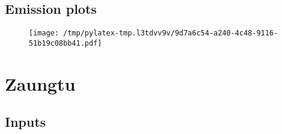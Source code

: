 \documentclass{article}%
\begin{document}
\subsection{Emission plots}%
\label{subsec:Emissionplots}%


\begin{figure}[htbp]%
\centering%
\texttt{[image: /tmp/pylatex-tmp.l3tdvv9v/9d7a6c54-a240-4c48-9116-51b19c08bb41.pdf]}%
\end{figure}

%
\section{Zaungtu}%
\label{sec:Zaungtu}%
\subsection{Inputs}%
\label{subsec:Inputs}%
\end{document}
